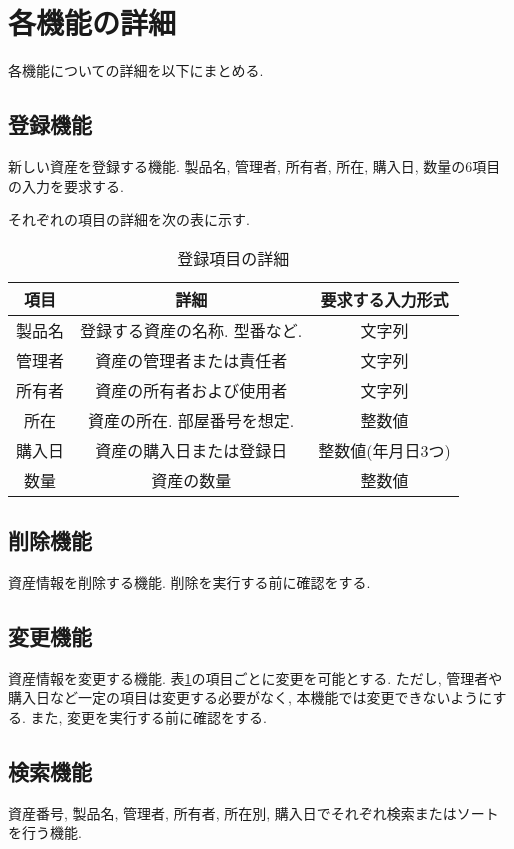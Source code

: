 \documentclass[11ptm]{jsarticle}
\begin{document}
\newpage
\section{各機能の詳細}
\label{sec:各機能の詳細}
各機能についての詳細を以下にまとめる. 

\subsection{登録機能}
\label{subsec:登録機能}
新しい資産を登録する機能. 製品名, 管理者, 所有者, 所在, 購入日, 数量の6項目の入力を要求する. \par
それぞれの項目の詳細を次の表に示す. 
\begin{table}[htpb]
  \caption{登録項目の詳細}
  \label{tb:登録項目の詳細}
  \centering
  \begin{tabular}{c|c|c}
    項目 & 詳細 & 要求する入力形式 \\
    \hline \hline
    製品名 & 登録する資産の名称. 型番など.  & 文字列 \\
    \hline
    管理者 & 資産の管理者または責任者 & 文字列 \\
    \hline
    所有者 & 資産の所有者および使用者 & 文字列 \\
    \hline
    所在 & 資産の所在. 部屋番号を想定.  & 整数値 \\
    \hline
    購入日 & 資産の購入日または登録日 & 整数値(年月日3つ) \\
    \hline
    数量 & 資産の数量 & 整数値
  \end{tabular}
\end{table}

\subsection{削除機能}
\label{subsec:削除機能}
資産情報を削除する機能. 削除を実行する前に確認をする. 

\subsection{変更機能}
\label{subsec:変更機能}
資産情報を変更する機能. 表\ref{tb:登録項目の詳細}の項目ごとに変更を可能とする. ただし, 管理者や購入日など一定の項目は変更する必要がなく, 本機能では変更できないようにする. また, 変更を実行する前に確認をする. 

\subsection{検索機能}
\label{subsec:検索機能}
資産番号, 製品名, 管理者, 所有者, 所在別, 購入日でそれぞれ検索またはソートを行う機能. 
\end{document}
